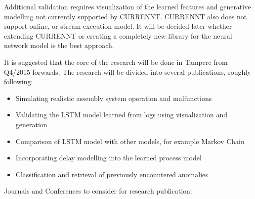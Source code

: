 \documentclass[a4paper,10pt]{article}
\begin{document}
Additional validation requires visualization of the learned features and generative modelling not currently supported by CURRENNT.
CURRENNT also does not support online, or stream execution model. It will be decided later whether extending CURRENNT or creating a completely new library for
the neural network model is the best approach.

It is suggested that the core of the research will be done in Tampere from Q4/2015 forwards.
The research will be divided into several publications, roughly following:
\begin{itemize}
 \item Simulating realistic assembly system operation and malfunctions
 \item Validating the LSTM model learned from logs using visualization and generation
 \item Comparison of LSTM model with other models, for example Markov Chain
 \item Incorporating delay modelling into the learned process model
 \item Classification and retrieval of previously encountered anomalies
\end{itemize}
Journals and Conferences to consider for research publication:
\end{document}
